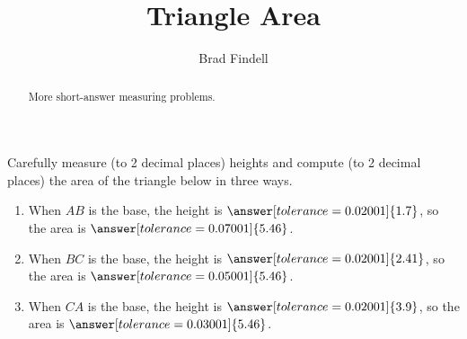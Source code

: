 \documentclass[nooutcomes]{ximera}
\title{Triangle Area}
\author{Brad Findell}
\begin{document}
\begin{abstract}
More short-answer measuring problems.
\end{abstract}
\maketitle

\begin{problem}
Carefully measure (to 2 decimal places) heights and compute (to 2 decimal places) the area of the triangle below in three ways.  
\begin{center}  
\end{center}
\begin{enumerate}
\item When $AB$ is the base, the height is $\answer[tolerance=0.02001]{1.7}$, so the area is $\answer[tolerance=0.07001]{5.46}$.
\item When $BC$ is the base, the height is $\answer[tolerance=0.02001]{2.41}$, so the area is $\answer[tolerance=0.05001]{5.46}$.
\item When $CA$ is the base, the height is $\answer[tolerance=0.02001]{3.9}$, so the area is $\answer[tolerance=0.03001]{5.46}$.
\end{enumerate}
\end{problem}
\end{document}
